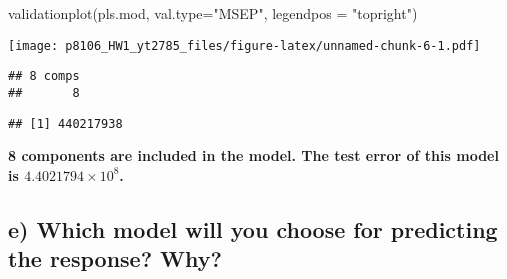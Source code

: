 \documentclass[
]{article}
\newenvironment{Shaded}{\begin{snugshade}}{\end{snugshade}}
\newcommand{\AttributeTok}[1]{\textcolor[rgb]{0.77,0.63,0.00}{#1}}
\newcommand{\CommentTok}[1]{\textcolor[rgb]{0.56,0.35,0.01}{\textit{#1}}}
\newcommand{\DecValTok}[1]{\textcolor[rgb]{0.00,0.00,0.81}{#1}}
\newcommand{\FunctionTok}[1]{\textcolor[rgb]{0.00,0.00,0.00}{#1}}
\newcommand{\NormalTok}[1]{#1}
\newcommand{\OtherTok}[1]{\textcolor[rgb]{0.56,0.35,0.01}{#1}}
\newcommand{\SpecialCharTok}[1]{\textcolor[rgb]{0.00,0.00,0.00}{#1}}
\newcommand{\StringTok}[1]{\textcolor[rgb]{0.31,0.60,0.02}{#1}}
\begin{document}
\begin{Shaded}
\begin{Highlighting}[]
\FunctionTok{validationplot}\NormalTok{(pls.mod, }\AttributeTok{val.type=}\StringTok{"MSEP"}\NormalTok{, }\AttributeTok{legendpos =} \StringTok{"topright"}\NormalTok{)}
\end{Highlighting}
\end{Shaded}

\texttt{[image: p8106\_HW1\_yt2785\_files/figure-latex/unnamed-chunk-6-1.pdf]}

\begin{Shaded}
\end{Shaded}

\begin{verbatim}
## 8 comps 
##       8
\end{verbatim}

\begin{Shaded}
\end{Shaded}

\begin{verbatim}
## [1] 440217938
\end{verbatim}

\textbf{8 components are included in the model. The test error of this
model is \ensuremath{4.4021794\times 10^{8}}.}

\hypertarget{e-which-model-will-you-choose-for-predicting-the-response-why}{%
\subsection{e) Which model will you choose for predicting the response?
Why?}\label{e-which-model-will-you-choose-for-predicting-the-response-why}}
\end{document}
